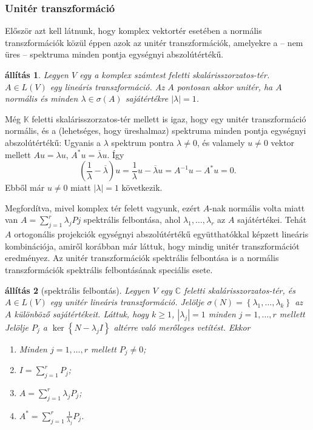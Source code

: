 \documentclass[9pt, a4paper, showtrims]{memoir}
\makeatletter
\renewenvironment{proof}[1][\proofname]
    {\par\pushQED{\qed}%
    \normalfont \topsep6\p@\@plus6\p@\relax
    \trivlist
    \item[\hskip\labelsep
        \itshape
    #1\@addpunct{:}]\ignorespaces}
    {\popQED\endtrivlist\@endpefalse}
\theoremstyle{plain}
\newtheorem{proposition}{állítás}[chapter]
\theoremstyle{remark}
\theoremstyle{definition}
\makeatother
\begin{document}
\subsubsection{Unitér transzformáció}
Először azt kell látnunk, 
hogy komplex vektortér esetében a normális transzformációk közül éppen azok az unitér transzformációk,
amelyekre a -- nem üres -- spektruma minden pontja egységnyi abszolútértékű.
\begin{proposition}
    Legyen $V$ egy a komplex számtest feletti skalárisszorzatos-tér.
    $A\in L\left( V \right)$ egy lineáris transzformáció.
    Az $A$ pontosan akkor unitér, ha $A$ normális és minden $\lambda\in\sigma\left( A \right)$ sajátértékre
    $|\lambda|=1$.
\end{proposition}
\begin{proof}
    Még $\mathbb{K}$ feletti skalárisszorzatos-tér mellett is igaz,
    hogy egy unitér transzformáció normális,
    és a (lehetséges, hogy üreshalmaz) spektruma minden pontja egységnyi abszolútértékű:
    Ugyanis a $\lambda$ spektrum pontra $\lambda\neq 0$, 
    és valamely $u\neq 0$ vektor mellett
    $Au=\lambda u$, $A^\ast u=\overline{\lambda}u$. Így 
    \[
        \left( \frac{1}{\lambda}-\overline{\lambda} \right)u
        =
        \frac{1}{\lambda}u-\overline{\lambda}u
        =
        A^{-1}u-A^\ast u
        =0.
    \]
    Ebből már 
    $u\neq 0$ miatt $|\lambda|=1$ következik.

    Megfordítva,
    mivel komplex tér felett vagyunk, 
    ezért $A$-nak normális volta miatt van
    $A=\sum_{j=1}^r\lambda_jPj$ spektrális felbontása,
    ahol $\lambda_1,\dots,\lambda_r$ az $A$ sajátértékei.
    Tehát $A$ ortogonális projekciók egységnyi abszolútértékű együtthatókkal képzett lineáris kombinációja,
    amiről korábban már láttuk, hogy mindig unitér transzformációt eredményez.
\end{proof}
Az unitér transzformációk spektrális felbontása is
a normális transzformációk spektrális felbontásának speciális esete.
\begin{proposition}[spektrális felbontás]
    Legyen $V$ egy $\mathbb{C}$ feletti skalárisszorzatos-tér, és $A\in L\left( V \right)$
    egy unitér lineáris transzformáció.
    Jelölje $\sigma\left( N \right)=\left\{\lambda_1,\dots,\lambda_k  \right\}$ az $A$ különböző sajátértékeit.
    Láttuk, hogy $k\geq 1$, $|\lambda_j|=1$ minden $j=1,\dots,r$ mellett
    Jelölje $P_j$ a $\ker\left\{ N-\lambda_jI \right\}$ altérre való merőleges vetítést.
    Ekkor
    \begin{enumerate}
        \item Minden $j=1,\dots,r$ mellett $P_j\neq 0$;
        \item $I=\sum_{j=1}^rP_j$;
        \item $A=\sum_{j=1}^r\lambda_jP_j$;
        \item $A^\ast=\sum_{j=1}^r\frac{1}{\lambda_j}P_j$.
            \qedhere
    \end{enumerate}
\end{proposition}
\end{document}
